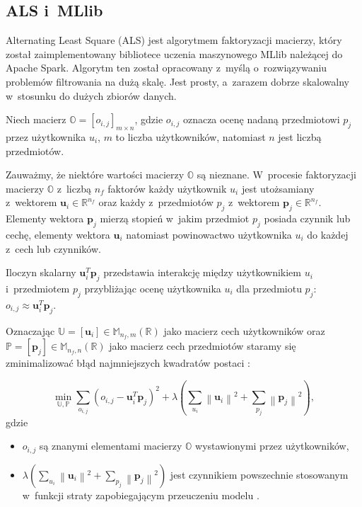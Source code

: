 \documentclass[12pt,a4paper]{report}
\newcommand{\setR}{\mathbb{R}}
\newcommand{\norm}[2][]{\left\| {#2} \right\|_{#1}}
\begin{document}
\subsection{ALS i~MLlib}
Alternating Least Square (ALS) jest algorytmem faktoryzacji macierzy, który został zaimplementowany bibliotece uczenia maszynowego MLlib należącej do Apache Spark. Algorytm ten został opracowany z~myślą o~rozwiązywaniu problemów filtrowania na dużą skalę. Jest prosty, a~zarazem dobrze skalowalny w~stosunku do dużych zbiorów danych.

Niech macierz $\mathbb{O}=[o_{i,j}]_{m \times n}$, gdzie $o_{i,j}$ oznacza ocenę nadaną przedmiotowi $p_j$ przez użytkownika $u_i$, $m$ to liczba użytkowników, natomiast $n$ jest liczbą przedmiotów.

Zauważmy, że niektóre wartości macierzy $\mathbb{O}$ są nieznane. W~procesie faktoryzacji macierzy $\mathbb{O}$ z~liczbą $n_f$ faktorów każdy użytkownik $u_i$ jest utożsamiany z~wektorem $\mathbf{u}_i \in \setR^{n_f}$ oraz każdy z~przedmiotów $p_j$ z~wektorem $\mathbf{p}_j \in \setR^{n_f}$. Elementy wektora $\mathbf{p}_j$ mierzą stopień w~jakim przedmiot $p_j$ posiada czynnik lub cechę, elementy wektora $\mathbf{u}_i$ natomiast powinowactwo użytkownika $u_i$ do każdej z~cech lub czynników.

Iloczyn skalarny $\mathbf{u}_i^T \mathbf{p}_j$ przedstawia interakcję między użytkownikiem $u_i$ i~przedmiotem $p_j$ przybliżając ocenę użytkownika $u_i$ dla przedmiotu $p_j$: $o_{i,j} \approx \mathbf{u}_i^T \mathbf{p}_j$. 

Oznaczając $\mathbb{U}=[\mathbf{u}_i] \in \mathbb{M}_{n_f,m}(\setR)$ jako macierz cech użytkowników oraz $\mathbb{P}=[\mathbf{p}_j] \in \mathbb{M}_{n_f,n}(\setR)$ jako macierz cech przedmiotów staramy się zminimalizować błąd najmniejszych kwadratów postaci {\citep{mcvals}}:

$$
\min_{\mathbb{U}, \mathbb{P}} \sum_{o_{i,j}} (o_{i,j} - \mathbf{u}_i^T \mathbf{p}_j)^2 + \lambda (\sum_{u_i} \norm{\mathbf{u}_i}^2 + \sum_{p_j} \norm{\mathbf{p}_j}^2),
$$
gdzie 
\begin{itemize}
\item $o_{i,j}$ są znanymi elementami macierzy $\mathbb{O}$ wystawionymi przez użytkowników,
\item $\lambda (\sum_{u_i} \norm{\mathbf{u}_i}^2 + \sum_{p_j} \norm{\mathbf{p}_j}^2)$ jest czynnikiem powszechnie stosowanym w~funkcji straty zapobiegającym przeuczeniu modelu .
\end{itemize}
\end{document}
